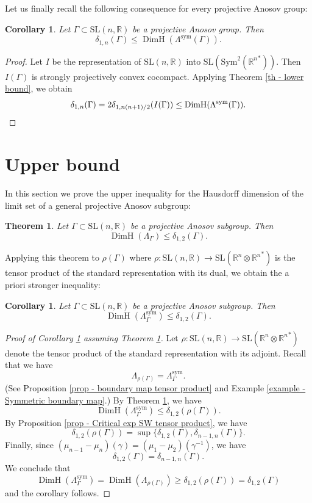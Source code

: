 \documentclass[11pt]{article}
\numberwithin{equation}{section}
\newtheorem{theorem}[theo]{Theorem}
\newtheorem{coro}[theo]{Corollary}
\theoremstyle{definition}
\newcommand{\R}{\mathbb{R}}
\newcommand{\SL}{\mathrm{SL}}
\DeclareMathOperator{\DimH}{DimH}
\let\G\Gamma
\let\g\gamma
\begin{document}
Let us finally recall the following consequence for every projective Anosov group:
\begin{coro}
Let $\G \subset \SL(n,\R)$ be a projective Anosov group. Then
\[\delta_{1,n}(\G) \leq \DimH(\Lambda^{\mathrm{sym}}(\G)).\]
\end{coro}

\begin{proof}
Let $I$ be the representation of $\SL(n,\R)$ into $\SL(\mathrm{Sym}^2({\R^n}^*))$. Then $I(\G)$ is strongly projectively convex cocompact. Applying Theorem \ref{th - lower bound}, we obtain
\[\delta_{1,n}(\G) = 2 \delta_{1, n(n+1)/2}(I(\G)) \leq \DimH(\Lambda^{\mathrm{sym}}(\G)).\qedhere\]
\end{proof}

\section{Upper bound} \label{sec - upper bound}

In this section we prove the upper inequality for the Hausdorff dimension of the limit set of a general projective Anosov subgroup:

\begin{theorem} \label{th - upper bound}
Let $\G\subset \SL(n,\R)$ be a projective Anosov subgroup. Then
\[\DimH(\Lambda_\G) \leq \delta_{1,2}(\G).\]
\end{theorem}

Applying this theorem to $\rho(\G)$ where $\rho: \SL(n,\R) \to \SL(\R^n \otimes {\R^n}^*)$ is the tensor product of the standard representation with its dual, we obtain the a priori stronger inequality:

\begin{coro} \label{c - upper bound symmetric}
Let $\G\subset \SL(n,\R)$ be a projective Anosov subgroup. Then
\[\DimH(\Lambda^{\mathrm{sym}}_\G) \leq \delta_{1,2}(\G).\]
\end{coro}

\begin{proof}[Proof of Corollary \ref{c - upper bound symmetric} assuming Theorem \ref{th - upper bound}]
Let $\rho: \SL(n,\R) \to \SL(\R^n \otimes {\R^n}^*)$ denote the tensor product of the standard representation with its adjoint. Recall that we have
\[\Lambda_{\rho(\Gamma)}= \Lambda_\Gamma^{\mathrm{sym}}.\]
(See Proposition \ref{prop - boundary map tensor product} and Example \ref{example - Symmetric boundary map}.)
By Theorem \ref{th - upper bound}, we have
\[\DimH(\Lambda^{\mathrm{sym}}_\G) \leq \delta_{1,2}(\rho(\G)).\]
By Proposition \ref{prop - Critical exp SW tensor product}, we have
\[\delta_{1,2}(\rho(\G)) = \sup \{\delta_{1,2}(\G), \delta_{n-1,n}(\G)\}.\] Finally, since $(\mu_{n-1}-\mu_n)(\g) = (\mu_1 - \mu_2)(\g^{-1})$, we have
\[\delta_{1,2}(\G) = \delta_{n-1,n}(\G).\]
We conclude that
\[\DimH(\Lambda_\Gamma^{\mathrm{sym}}) = \DimH(\Lambda_{\rho(\Gamma)}) \geq \delta_{1,2}(\rho(\G)) = \delta_{1,2}(\G)\]
and the corollary follows.
\end{proof}
\end{document}
